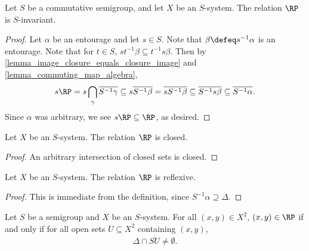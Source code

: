 \begin{lemma}
    \label{lemma_frp_basics_invariant}
    \leanok{}
    Let $S$ be a commutative semigroup, and let $X$ be an $S$-system.  The relation $\RP$ is $S$-invariant.
\end{lemma}

\begin{proof}
\leanok{}
    Let $\alpha$ be an entourage and let $s \in S$.  Note that $\beta \defeq s^{-1} \alpha$ is an entourage.  Note that for $t \in S$, $st^{-1} \beta \subseteq t^{-1} s \beta$. Then by \cref{lemma_image_closure_equals_closure_image} and \cref{lemma_commuting_map_algebra},
    \[s \RP = s \bigcap_{\gamma} \overline{S^{-1}\gamma} \subseteq s \overline{S^{-1} \beta} = \overline{sS^{-1} \beta} \subseteq \overline{S^{-1} s \beta} \subseteq \overline{S^{-1} \alpha}.\]
    Since $\alpha$ was arbitrary, we see $s \RP \subseteq \RP$, as desired.
\end{proof}

\begin{lemma}
\label{lemma_frp_basics_closed}
\leanok{}
    Let $X$ be an $S$-system.  The relation $\RP$ is closed.
\end{lemma}

\begin{proof}
\leanok{}
    An arbitrary intersection of closed sets is closed. 
\end{proof}

\begin{lemma}
\label{lemma_frp_reflexive}
\leanok{}
    Let $X$ be an $S$-system.  The relation $\RP$ is reflexive.
\end{lemma}

\begin{proof}
\leanok{}
    This is immediate from the definition, since $S^{-1} \alpha \supseteq \Delta.$
\end{proof}

\begin{lemma}
\label{lemma_frp_iff_nbhd_tran_int_hits_diagonal}
\leanok{}
    Let $S$ be a semigroup and $X$ be an $S$-system.  For all $(x,y) \in X^2$, $(x,y) \in \RP$ if and only if for all open sets $U \subseteq X^2$ containing $(x,y)$,
    \begin{align}
    \label{eqn_in_rp_equiv_set_v2}
         \Delta \cap \overline{S U} \neq \emptyset.
    \end{align}
\end{lemma}


